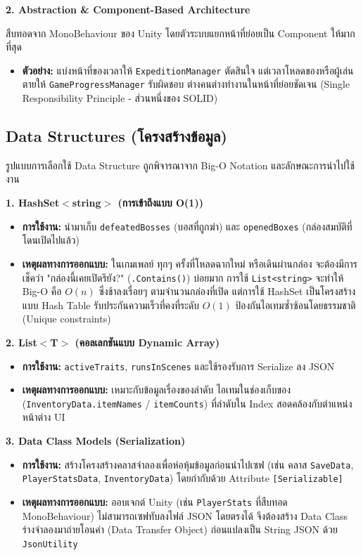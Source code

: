 \textbf{2. Abstraction \& Component-Based Architecture}

สืบทอดจาก MonoBehaviour ของ Unity โดยตัวระบบแยกหน้าที่ย่อยเป็น Component ให้มากที่สุด

\begin{itemize}
\item \textbf{ตัวอย่าง:} แบ่งหน้าที่ของเวลาให้ \texttt{ExpeditionManager} ตัดสินใจ แต่เวลาโหลดของหรือผู้เล่นตายให้ \texttt{GameProgressManager} รับผิดชอบ ต่างคนต่างทำงานในหน้าที่ย่อยชัดเจน (Single Responsibility Principle - ส่วนหนึ่งของ SOLID)
\end{itemize}

\subsection{Data Structures (โครงสร้างข้อมูล)}

รูปแบบการเลือกใช้ Data Structure ถูกพิจารณาจาก Big-O Notation และลักษณะการนำไปใช้งาน

\textbf{1. HashSet$<$string$>$ (การเข้าถึงแบบ O(1))}

\begin{itemize}
\item \textbf{การใช้งาน:} นำมาเก็บ \texttt{defeatedBosses} (บอสที่ถูกฆ่า) และ \texttt{openedBoxes} (กล่องสมบัติที่โดนเปิดไปแล้ว)
\item \textbf{เหตุผลทางการออกแบบ:} ในเกมเพลย์ ทุกๆ ครั้งที่โหลดฉากใหม่ หรือเดินผ่านกล่อง จะต้องมีการเช็คว่า "กล่องนี้เคยเปิดรึยัง?" (\texttt{.Contains()}) บ่อยมาก การใช้ \texttt{List<string>} จะทำให้ Big-O คือ $O(n)$ ซึ่งช้าลงเรื่อยๆ ตามจำนวนกล่องที่เปิด แต่การใช้ HashSet เป็นโครงสร้างแบบ Hash Table รับประกันความเร็วที่คงที่ระดับ $O(1)$ ป้องกันไอเทมซ้ำซ้อนโดยธรรมชาติ (Unique constraints)
\end{itemize}

\textbf{2. List$<$T$>$ (คอลเลกชันแบบ Dynamic Array)}

\begin{itemize}
\item \textbf{การใช้งาน:} \texttt{activeTraits}, \texttt{runsInScenes} และใช้รองรับการ Serialize ลง JSON
\item \textbf{เหตุผลทางการออกแบบ:} เหมาะกับข้อมูลเรื่องของลำดับ ไอเทมในช่องเก็บของ (\texttt{InventoryData.itemNames} / \texttt{itemCounts}) ที่ลำดับใน Index สอดคล้องกับตำแหน่งหน้าต่าง UI
\end{itemize}

\textbf{3. Data Class Models (Serialization)}

\begin{itemize}
\item \textbf{การใช้งาน:} สร้างโครงสร้างคลาสจำลองเพื่อห่อหุ้มข้อมูลก่อนนำไปเซฟ (เช่น คลาส \texttt{SaveData}, \texttt{PlayerStatsData}, \texttt{InventoryData}) โดยกำกับด้วย Attribute \texttt{[Serializable]}
\item \textbf{เหตุผลทางการออกแบบ:} ออบเจกต์ Unity (เช่น \texttt{PlayerStats} ที่สืบทอด MonoBehaviour) ไม่สามารถเซฟทับลงไฟล์ JSON โดยตรงได้ จึงต้องสร้าง Data Class ร่างจำลองมาถ่ายโอนค่า (Data Transfer Object) ก่อนแปลงเป็น String JSON ด้วย \texttt{JsonUtility}
\end{itemize}


